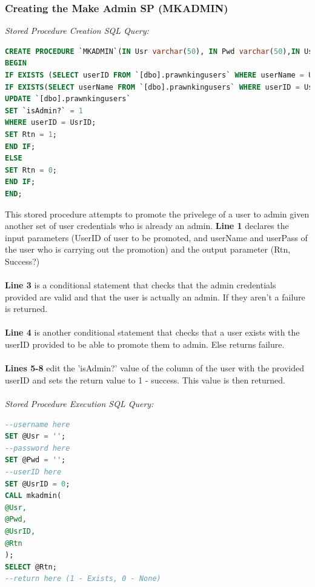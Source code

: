 \documentclass[a4paper,11pt]{proc}
\begin{document}
\subsubsection{Creating the Make Admin SP (MKADMIN)}
\textit{Stored Procedure Creation SQL Query:}
\begin{lstlisting}[language=SQL,
deletekeywords={IDENTITY,INT},
morekeywords={clustered,OUT, BEGIN, PROCEDURE},    
framesep=10pt,
framextopmargin=10pt]
CREATE PROCEDURE `MKADMIN`(IN Usr varchar(50), IN Pwd varchar(50),IN UsrID int, OUT Rtn bit)
BEGIN
IF EXISTS (SELECT userID FROM `[dbo].prawnkingusers` WHERE userName = Usr AND userPass = Pwd AND `isAdmin?` = 1) THEN
IF EXISTS(SELECT userName FROM `[dbo].prawnkingusers` WHERE userID = UsrID) THEN
UPDATE `[dbo].prawnkingusers`
SET `isAdmin?` = 1
WHERE userID = UsrID;
SET Rtn = 1;
END IF;
ELSE
SET Rtn = 0;
END IF;
END;
\end{lstlisting}
This stored procedure attempts to promote the privelege of a user to admin given another set of user credentials who is already an admin. \textbf{Line 1} declares the input parameters (UserID of user to be promoted, and userName and userPass of the user who is carrying out the promotion) and the output parameter (Rtn, Success?)\\
\\\textbf{Line 3} is  a conditional statement that checks that the admin credentials provided are valid and that the user is actually an admin. If they aren't a failure is returned.\\
\\\textbf{Line 4} is  another conditional statement that checks that a user exists with the userID provided to be able to promote them to admin. Else returns failure.\\
\\\textbf{Lines 5-8} edit the 'isAdmin?' value of the column of the user with the provided userID and sets the return value to 1 - success. This value is then returned.\\
\\\textit{Stored Procedure Execution SQL Query:}
\begin{lstlisting}[language=SQL,
deletekeywords={IDENTITY,INT},
morekeywords={clustered,OUT, BEGIN, PROCEDURE,CALL},    
framesep=10pt,
framextopmargin=10pt]
--username here
SET @Usr = '';
--password here
SET @Pwd = '';
--userID here
SET @UsrID = 0;
CALL mkadmin(
@Usr,
@Pwd,
@UsrID,
@Rtn
);
SELECT @Rtn;
--return here (1 - Exists, 0 - None)
\end{lstlisting}
\end{document}
